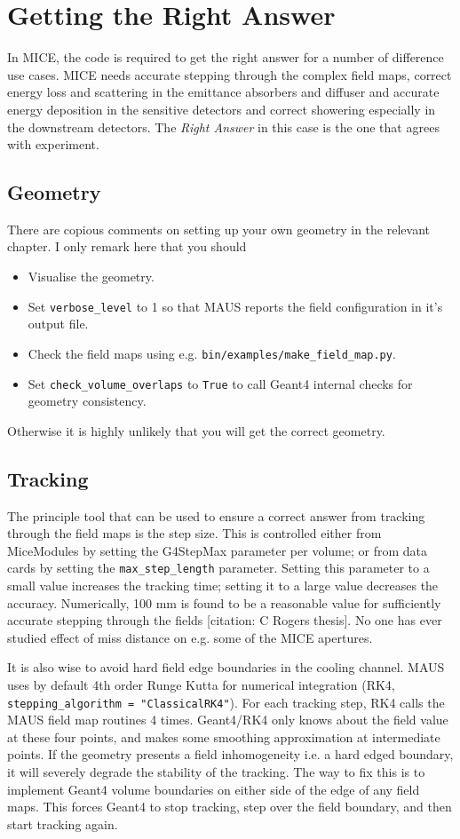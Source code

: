 \section{Getting the Right Answer}
In MICE, the code is required to get the right answer for a number of difference use cases. MICE needs accurate stepping through the complex field maps, correct energy loss and scattering in the emittance absorbers and diffuser and accurate energy deposition in the sensitive detectors and correct showering especially in the downstream detectors. The \emph{Right Answer} in this case is the one that agrees with experiment.

\subsection{Geometry}
There are copious comments on setting up your own geometry in the relevant chapter. I only remark here that you should
\begin{itemize}
\item Visualise the geometry.
\item Set \verb|verbose_level| to 1 so that MAUS reports the field configuration in it's output file.
\item Check the field maps using e.g. \verb|bin/examples/make_field_map.py|.
\item Set \verb|check_volume_overlaps| to \verb|True| to call Geant4 internal checks for geometry consistency.
\end{itemize}
Otherwise it is highly unlikely that you will get the correct geometry.

\subsection{Tracking}
The principle tool that can be used to ensure a correct answer from tracking through the field maps is the step size. This is controlled either from MiceModules by setting the G4StepMax parameter per volume; or from
data cards by setting the \verb|max_step_length| parameter. Setting this parameter to a small value increases the tracking time; setting it to a large value decreases the accuracy. Numerically, 100 mm is found to be a reasonable value for sufficiently accurate stepping through the fields [citation: C Rogers thesis]. No one has ever studied effect of miss distance on e.g. some of the MICE apertures.

It is also wise to avoid hard field edge boundaries in the cooling channel. MAUS uses by default 4th order Runge Kutta for numerical integration (RK4, \verb|stepping_algorithm = "ClassicalRK4"|). For each tracking step, RK4 calls the MAUS field map routines 4 times. Geant4/RK4 only knows about the field value at these four points, and makes some smoothing approximation at intermediate points. If the geometry presents a field inhomogeneity i.e. a hard edged boundary, it will severely degrade the stability of the tracking. The way to fix this is to implement Geant4 volume boundaries on either side of the edge of any field maps. This forces Geant4 to stop tracking, step over the field boundary, and then start tracking again.

